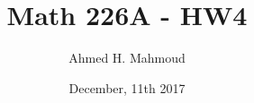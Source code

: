 \documentclass[12pt]{article}
\begin{document}
\title{Math 226A - HW4}
\author{Ahmed H. Mahmoud}
\date{December, 11th 2017} 

\maketitle

\newcommand{\cn}{Crank-Nicolson}






\newpage



\newpage



\newpage





\end{document}
